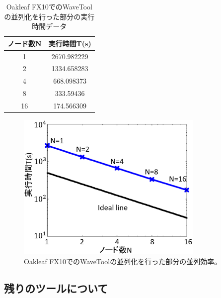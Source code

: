 \documentclass{jsarticle}
\begin{document}
\begin{table}[H]
  \centering
  \caption{Oakleaf FX10でのWaveToolの並列化を行った部分の実行時間データ}
  \label{table:pi-02}

  \begin{tabular}{|c|c|} \hline
   ノード数N & 実行時間T(s) \\ \hline
   1 & 2670.982229 \\ \hline
   2 & 1334.658283 \\ \hline
   4 & 668.098373 \\ \hline
   8 & 333.59436 \\ \hline
  16 & 174.566309 \\ \hline
  \end{tabular}
\end{table}

\begin{figure}[H]
\centering
\includegraphics[width=9cm,clip]{fig/oakleaf_WaveTool.eps}
\caption{Oakleaf FX10でのWaveToolの並列化を行った部分の並列効率。}
\label{fig:pi-01}
\end{figure}

\subsection{残りのツールについて}
\end{document}
